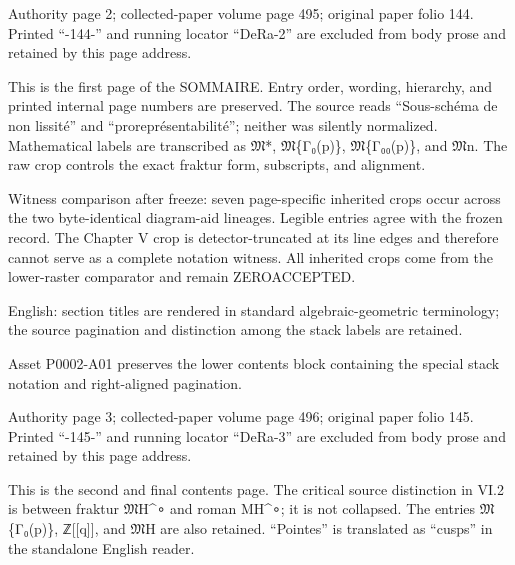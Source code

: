 \documentclass[11pt,a4paper]{article}
\begin{document}
\par\medskip
\hypertarget{D018-P0002}{}
\par\smallskip
Authority page 2; collected-paper volume page 495; original paper folio 144. Printed “-144-” and running locator “DeRa-2” are excluded from body prose and retained by this page address.

This is the first page of the SOMMAIRE. Entry order, wording, hierarchy, and printed internal page numbers are preserved. The source reads “Sous-schéma de non lissité” and “proreprésentabilité”; neither was silently normalized. Mathematical labels are transcribed as \ensuremath{\mathfrak{M}}\textunderscore{}*, \ensuremath{\mathfrak{M}}\textunderscore{}\{Γ₀(p)\}, \ensuremath{\mathfrak{M}}\textunderscore{}\{Γ₀₀(p)\}, and \ensuremath{\mathfrak{M}}\textunderscore{}n. The raw crop controls the exact fraktur form, subscripts, and alignment.

Witness comparison after freeze: seven page-specific inherited crops occur across the two byte-identical diagram-aid lineages. Legible entries agree with the frozen record. The Chapter V crop is detector-truncated at its line edges and therefore cannot serve as a complete notation witness. All inherited crops come from the lower-raster comparator and remain ZERO\textunderscore{}ACCEPTED.

English: section titles are rendered in standard algebraic-geometric terminology; the source pagination and distinction among the stack labels are retained.

Asset P0002-A01 preserves the lower contents block containing the special stack notation and right-aligned pagination.


\par\medskip
\hypertarget{D018-P0003}{}
\par\smallskip
Authority page 3; collected-paper volume page 496; original paper folio 145. Printed “-145-” and running locator “DeRa-3” are excluded from body prose and retained by this page address.

This is the second and final contents page. The critical source distinction in VI.2 is between fraktur \ensuremath{\mathfrak{M}}\textunderscore{}H\textasciicircum{}∘ and roman M\textunderscore{}H\textasciicircum{}∘; it is not collapsed. The entries \ensuremath{\mathfrak{M}}\textunderscore{}\{Γ₀(p)\}, ℤ[[q]], and \ensuremath{\mathfrak{M}}\textunderscore{}H are also retained. “Pointes” is translated as “cusps” in the standalone English reader.
\end{document}
